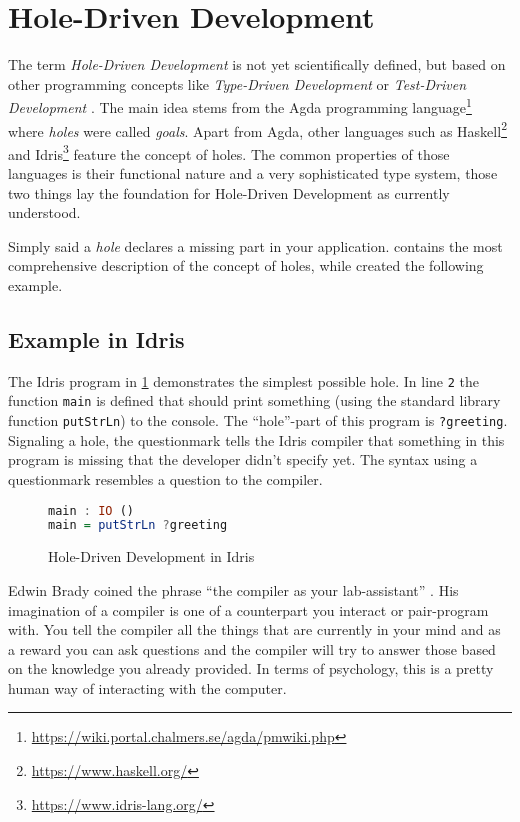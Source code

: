 \section{Hole-Driven Development}
\label{sec:hole-driven-development}
The term \emph{Hole-Driven Development} is not yet scientifically defined, but based on other programming concepts like \emph{Type-Driven Development} \autocite{brady_type-driven_2017} or \emph{Test-Driven Development} \autocite{mccracken_digital_1957}.
The main idea stems from the Agda programming language\footnote{\url{https://wiki.portal.chalmers.se/agda/pmwiki.php}} where \emph{holes} were called \emph{goals}.
Apart from Agda, other languages such as Haskell\footnote{\url{https://www.haskell.org/}} and Idris\footnote{\url{https://www.idris-lang.org/}} feature the concept of holes.
The common properties of those languages is their functional nature and a very sophisticated type system, those two things lay the foundation for Hole-Driven Development as currently understood.

Simply said a \emph{hole} declares a missing part in your application.
\textcite{gamari_haskell_2019} contains the most comprehensive description of the concept of holes, while \textcite{brady_type-driven_2017} created the following example.

\subsection{Example in Idris}
\label{sub:hole-driven-development-in-idris}
The Idris program in \ref{fig:idris-program-hole} demonstrates the simplest possible hole.
In line \verb|2| the function \verb|main| is defined that should print something (using the standard library function \verb|putStrLn|) to the console.
The ``hole''-part of this program is \verb|?greeting|.
Signaling a hole, the questionmark tells the Idris compiler that something in this program is missing that the developer didn't specify yet.
The syntax using a questionmark resembles a question to the compiler.

\begin{figure}[h!]
\begin{lstlisting}[language=Haskell,firstnumber=1]
main : IO ()
main = putStrLn ?greeting
\end{lstlisting}
\caption{Hole-Driven Development in Idris}
\label{fig:idris-program-hole}
\end{figure}

Edwin Brady coined the phrase ``the compiler as your lab-assistant'' \autocite{brady_type-driven_2017}.
His imagination of a compiler is one of a counterpart you interact or pair-program with.
You tell the compiler all the things that are currently in your mind and as a reward you can ask questions and the compiler will try to answer those based on the knowledge you already provided.
In terms of psychology, this is a pretty human way of interacting with the computer.

